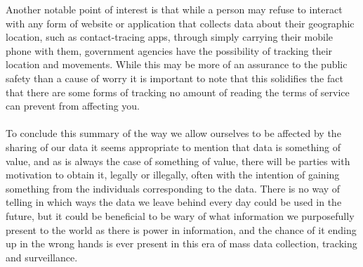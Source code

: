 \documentclass[11pt]{article}
\begin{document}
Another notable point of interest is that while a person may refuse to interact with any form of website or application that collects data about their geographic location, such as contact-tracing apps, through simply carrying their mobile phone with them, government agencies have the possibility of tracking their location and movements. While this may be more of an assurance to the public safety than a cause of worry it is important to note that this solidifies the fact that there are some forms of tracking no amount of reading the terms of service can prevent from affecting you.
\\ \\
To conclude this summary of the way we allow ourselves to be affected by the sharing of our data it seems appropriate to mention that data is something of value, and as is always the case of something of value, there will be parties with motivation to obtain it, legally or illegally, often with the intention of gaining something from the individuals corresponding to the data. There is no way of telling in which ways the data we leave behind every day could be used in the future, but it could be beneficial to be wary of what information we purposefully present to the world as there is power in information, and the chance of it ending up in the wrong hands is ever present in this era of mass data collection, tracking and surveillance.
\\ \\

\end{document}
